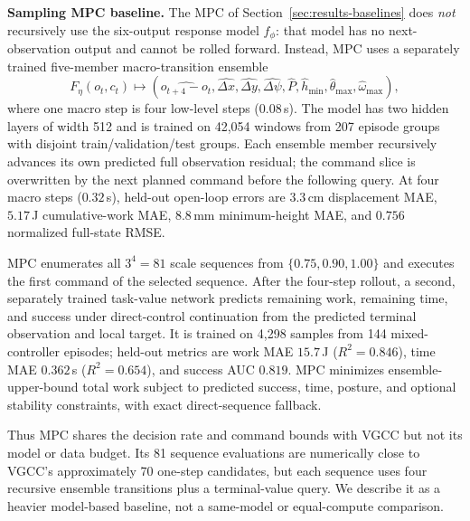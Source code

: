 \textbf{Sampling MPC baseline.}
The MPC of Section~\ref{sec:results-baselines} does \emph{not} recursively use
the six-output response model $f_\phi$: that model has no next-observation
output and cannot be rolled forward. Instead, MPC uses a separately trained
five-member macro-transition ensemble
\[
F_\eta(o_t,c_t)\mapsto
(\widehat{o_{t+4}-o_t},\widehat{\Delta x},\widehat{\Delta y},
\widehat{\Delta\psi},\widehat P,\widehat h_{\min},
\widehat{\theta}_{\max},\widehat{\omega}_{\max}),
\]
where one macro step is four low-level steps ($0.08$\,s). The model has two
hidden layers of width 512 and is trained on 42{,}054 windows from 207 episode
groups with disjoint train/validation/test groups. Each ensemble member
recursively advances its own predicted full observation residual; the command
slice is overwritten by the next planned command before the following query.
At four macro steps ($0.32$\,s), held-out open-loop errors are $3.3$\,cm
displacement MAE, $5.17$\,J cumulative-work MAE, $8.8$\,mm minimum-height MAE,
and $0.756$ normalized full-state RMSE.

MPC enumerates all $3^4=81$ scale sequences from
$\{0.75,0.90,1.00\}$ and executes the first command of the selected sequence.
After the four-step rollout, a second, separately trained task-value network
predicts remaining work, remaining time, and success under direct-control
continuation from the predicted terminal observation and local target. It is
trained on 4{,}298 samples from 144 mixed-controller episodes; held-out metrics
are work MAE $15.7$\,J ($R^2=0.846$), time MAE $0.362$\,s
($R^2=0.654$), and success AUC $0.819$. MPC minimizes ensemble-upper-bound total
work subject to predicted success, time, posture, and optional stability
constraints, with exact direct-sequence fallback.

Thus MPC shares the decision rate and command bounds with VGCC but not its model
or data budget. Its 81 sequence evaluations are numerically close to VGCC's
approximately 70 one-step candidates, but each sequence uses four recursive
ensemble transitions plus a terminal-value query. We describe it as a heavier
model-based baseline, not a same-model or equal-compute comparison.

